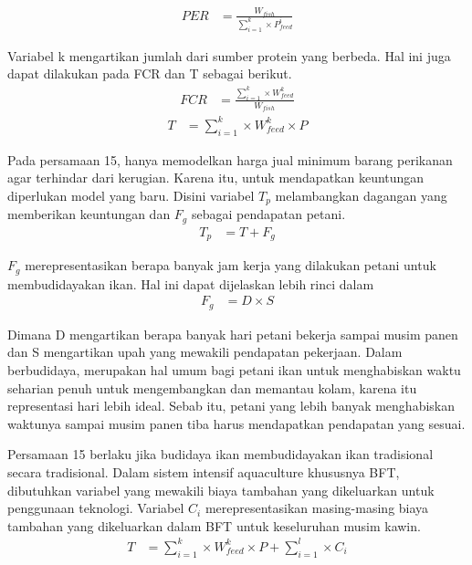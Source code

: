 \begin{equation}
    \begin{split}
		PER
		&= \frac{W_{fish}}{\sum_{i=1}^k \times P^i_{feed}}
    \end{split}
\end{equation}

Variabel k mengartikan jumlah dari sumber protein yang berbeda. Hal ini juga dapat dilakukan pada FCR dan T sebagai berikut.
\begin{equation}
    \begin{split}
		FCR
		&= \frac{\sum_{i=1}^k \times W^k_{feed}}{W_{fish}}
    \end{split}
\end{equation}
\begin{equation}
    \begin{split}
		T
		&= \sum_{i=1}^k \times W^k_{feed} \times P
    \end{split}
\end{equation}

Pada persamaan 15, hanya memodelkan harga jual minimum barang perikanan agar terhindar dari kerugian. Karena itu, untuk mendapatkan keuntungan diperlukan model yang baru. Disini variabel $T_p$ melambangkan dagangan yang memberikan keuntungan dan $F_g$ sebagai pendapatan petani.
\begin{equation}
    \begin{split}
		T_p
		&= T + F_g
    \end{split}
\end{equation}

$F_g$ merepresentasikan berapa banyak jam kerja yang dilakukan petani untuk membudidayakan ikan. Hal ini dapat dijelaskan lebih rinci dalam
\begin{equation}
    \begin{split}
		F_g
		&= D \times S
    \end{split}
\end{equation}

Dimana D mengartikan berapa banyak hari petani bekerja sampai musim panen dan S mengartikan upah yang mewakili pendapatan pekerjaan. Dalam berbudidaya, merupakan hal umum bagi petani ikan untuk menghabiskan waktu seharian penuh untuk mengembangkan dan memantau kolam, karena itu representasi hari lebih ideal. Sebab itu, petani yang lebih banyak menghabiskan waktunya sampai musim panen tiba harus mendapatkan pendapatan yang sesuai.

Persamaan 15 berlaku jika budidaya ikan membudidayakan ikan tradisional secara tradisional. Dalam sistem intensif aquaculture khususnya BFT, dibutuhkan variabel yang mewakili biaya tambahan yang dikeluarkan untuk penggunaan teknologi. Variabel ${C_i}$ merepresentasikan masing-masing biaya tambahan yang dikeluarkan dalam BFT untuk keseluruhan musim kawin.
\begin{equation}
    \begin{split}
		T
		&= \sum_{i=1}^k \times W^k_{feed} \times P + \sum_{i=1}^l \times C_i
    \end{split}
\end{equation}

